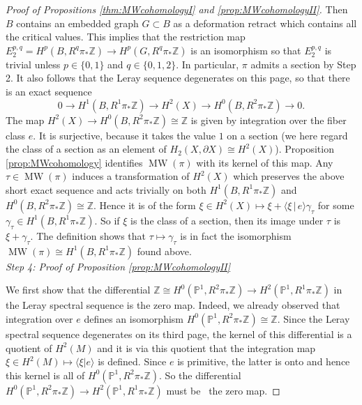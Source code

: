 \documentclass[10pt,letterpaper]{amsart}
\numberwithin{equation}{section}
\def\PP{{\mathbb P}}
\def\ZZ{{\mathbb Z}}
\def\g{\gamma}
\newcommand{\p}{\partial}
\def\la{\langle}
\def\ra{\rangle}
\newcommand\MW{\operatorname{MW}}
\theoremstyle{remark}
\begin{document}
\begin{proof}[Proof of  Propositions  \ref{thm:MWcohomologyI} and \ref{prop:MWcohomologyII}]
Then $B$ contains an embedded  graph $G\subset B$ as a deformation retract which  contains all the  critical values. This implies that the restriction map  $E_2^{p,q}= H^p(B, R^q\pi_*\ZZ)\to H^p(G, R^q\pi_*\ZZ)$ is an isomorphism  so that $E_2^{p,q}$ is trivial unless 
$p\in \{0,1\}$ and $q\in \{0,1,2\}$.  In particular, $\pi$  admits a section by Step 2. It also follows that  the Leray sequence degenerates on this page, so that  there is an exact sequence
\[
0\to H^1(B, R^1\pi_*\ZZ)\to H^2(X)\to H^0(B, R^2\pi_*\ZZ)\to 0.
\]
The  map $H^2(X)\to H^0(B, R^2\pi_*\ZZ)\cong \ZZ$ is given by integration over the fiber class $e$. It is 
surjective, because it takes the value $1$ on a section (we here regard the class of a section as an element of 
$H_2(X, \p X)\cong H^2(X)$). Proposition \ref{prop:MWcohomology}  identifies  $\MW(\pi)$ with its kernel of 
this map.  Any  $\tau\in \MW(\pi)$ induces a transformation of $H^2(X)$ which preserves the above short 
exact sequence  and acts trivially on both $H^1(B, R^1\pi_*\ZZ)$ and $H^0(B, R^2\pi_*\ZZ)\cong\ZZ$. 
Hence it is of the form $\xi\in H^2(X)\mapsto \xi +\la \xi\, |\, e\ra \g_\tau$ for some 
$\g_\tau\in H^1(B, R^1\pi_*\ZZ)$. So if  $\xi$ is the class  of a section, then its image under $\tau$ is $\xi+\g_\tau$. 
The definition shows that $\tau\mapsto \g_\tau$ is in fact the isomorphism 
$\MW(\pi)\cong H^1(B, R^1\pi_*\ZZ)$ found above.
\\

\emph{Step 4: Proof  of  Proposition \ref{prop:MWcohomologyII}}

We first show that the differential $\ZZ\cong H^0(\PP^1, R^2\pi_*\ZZ)\to H^2(\PP^1, R^1\pi_*\ZZ)$ in the Leray 
spectral sequence is the zero map. Indeed, we already observed that integration over $e$ defines 
an isomorphism $H^0(\PP^1, R^2\pi_*\ZZ)\cong \ZZ$.
Since the Leray spectral sequence degenerates on its third page, the kernel of this differential is  a 
quotient of $H^2(M)$ and it is via this quotient that the integration map 
$\xi\in H^2(M)\mapsto \la\xi | e\ra$ is defined. Since $e$ is primitive, the latter is onto and hence this kernel 
is all of  $H^0(\PP^1, R^2\pi_*\ZZ)$. So the differential $H^0(\PP^1, R^2\pi_*\ZZ)\to H^2(\PP^1, R^1\pi_*\ZZ)$ must be \
the zero map. 


\end{proof}
\end{document}
